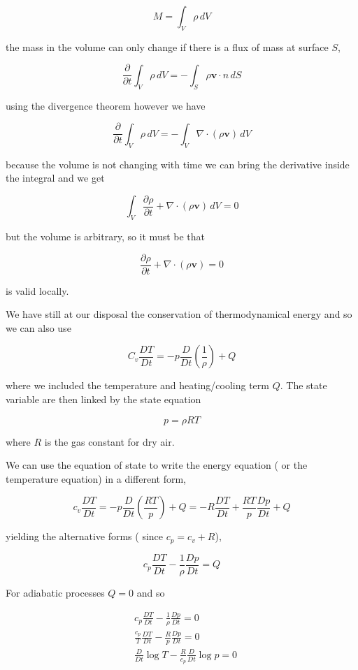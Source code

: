 \[M = \int_V  \rho \,dV\]

the mass in the volume can only change if there is a flux of mass at
surface \(S\),

\[\frac{\partial }{\partial t} \int_V  \rho \,dV = -\int_S \rho\mathbf{v}\cdot n \, dS\]

using the divergence theorem however we have

\[\frac{\partial }{\partial t} \int_V  \rho \,dV = -\int_V \nabla\cdot(\rho\mathbf{v}) \,dV\]

because the volume is not changing with time we can bring the derivative
inside the integral and we get

\[\int_V  \frac{\partial \rho}{\partial t}+\nabla\cdot(\rho\mathbf{v}) \,dV = 0\]

but the volume is arbitrary, so it must be that

\[\frac{\partial \rho}{\partial t}+\nabla\cdot(\rho\mathbf{v}) = 0\]

is valid locally.

We have still at our disposal the conservation of thermodynamical energy
and so we can also use

\[C_v\frac{D T}{Dt} = -p\frac{D }{Dt}\left(\frac{1}{\rho}\right)+ Q\]

where we included the temperature and heating/cooling term \(Q\). The
state variable are then linked by the state equation

\[p = \rho R T\]

where \(R\) is the gas constant for dry air.

We can use the equation of state to write the energy equation ( or the
temperature equation) in a different form,

\[c_v\frac{D T}{Dt} = -p\frac{D }{Dt}\left(\frac{R T}{p}\right)+ Q = -R\frac{D T}{Dt} + \frac{RT}{p}\frac{D p}{Dt} + Q\]

yielding the alternative forms ( since \(c_p = c_v +R\)),

\[c_p\frac{D T}{Dt}  - \frac{1}{\rho}\frac{D p}{Dt} = Q\]

For adiabatic processes \(Q=0\) and so

\[\begin{aligned}
&c_p\frac{D T}{Dt}  - \frac{1}{\rho}\frac{D p}{Dt} = 0\\
&\frac{c_p}{T}\frac{D T}{Dt} -\frac{R}{p}\frac{D p}{Dt} = 0\\
&\frac{D }{Dt}\log{T} - \frac{R}{c_p}\frac{D }{Dt}\log{p} = 0
\end{aligned}\]

